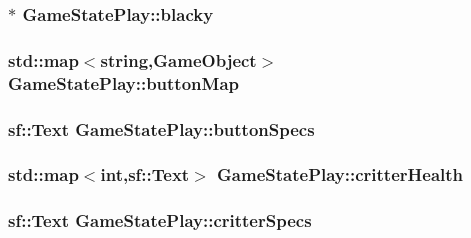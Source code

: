 \hypertarget{class_game_state_play_ace195ef46750d243d3bbaf2abaaf6e2e}{
\subsubsection[{blacky}]{$\ast$ Game\+State\+Play\+::blacky}}\label{class_game_state_play_ace195ef46750d243d3bbaf2abaaf6e2e}
\hypertarget{class_game_state_play_ab0755d9a7eb5708a840d82bbdc7eb9f2}{
\subsubsection[{button\+Map}]{\setlength{\rightskip}{0pt plus 5cm}std\+::map$<$string,{\bf Game\+Object}$>$ Game\+State\+Play\+::button\+Map\hspace{0.3cm}{\ttfamily [private]}}}\label{class_game_state_play_ab0755d9a7eb5708a840d82bbdc7eb9f2}
\hypertarget{class_game_state_play_a65d1a4d74f886ce3de872c1ffbb63d57}{
\subsubsection[{button\+Specs}]{\setlength{\rightskip}{0pt plus 5cm}sf\+::\+Text Game\+State\+Play\+::button\+Specs\hspace{0.3cm}{\ttfamily [private]}}}\label{class_game_state_play_a65d1a4d74f886ce3de872c1ffbb63d57}
\hypertarget{class_game_state_play_a7ca10b4aceefc0e2732ec427c5b5b5c5}{
\subsubsection[{critter\+Health}]{\setlength{\rightskip}{0pt plus 5cm}std\+::map$<$int,sf\+::\+Text$>$ Game\+State\+Play\+::critter\+Health\hspace{0.3cm}{\ttfamily [private]}}}\label{class_game_state_play_a7ca10b4aceefc0e2732ec427c5b5b5c5}
\hypertarget{class_game_state_play_a1667ea17be43ded7176a9dc28d99a8e1}{
\subsubsection[{critter\+Specs}]{\setlength{\rightskip}{0pt plus 5cm}sf\+::\+Text Game\+State\+Play\+::critter\+Specs\hspace{0.3cm}{\ttfamily [private]}}}\label{class_game_state_play_a1667ea17be43ded7176a9dc28d99a8e1}
